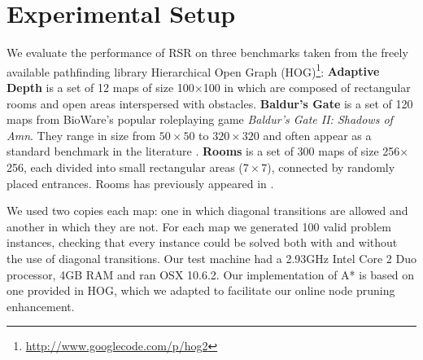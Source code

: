 \section{Experimental Setup}
We evaluate the performance of RSR on three benchmarks taken from the freely
available pathfinding library Hierarchical Open Graph
(HOG)\footnote{\url{http://www.googlecode.com/p/hog2}}: {\textbf{Adaptive Depth}
is a set of 12 maps of size 100$\times$100 in which are composed of rectangular
rooms and open areas interspersed with obstacles.} 
{\textbf{Baldur's
Gate} is a set of 120 maps from BioWare's popular roleplaying game
\emph{Baldur's Gate II: Shadows of Amn}.  They range in size from $50\times50$
to $320\times320$ and often appear as a standard
benchmark in the literature \cite{bjornsson06,harabor10,pochter10}.}
{\textbf{Rooms} is a set of 300 maps of size
256$\times$256, each divided into small rectangular areas
($7\times7$), connected by randomly placed entrances. Rooms has
previously appeared in \cite{sturtevant09,pochter10,goldenberg10}.}
\par
We used two copies each map: one in which diagonal transitions are allowed and 
another in which they are not.  
For each map we generated 100 valid problem instances, checking that every
instance could be solved both with and without the use of diagonal transitions.
Our test machine had a 2.93GHz Intel Core 2 Duo processor, 4GB RAM and ran OSX
10.6.2.  Our implementation of A* is based on one provided in HOG, which we
adapted to facilitate our online node pruning enhancement.
